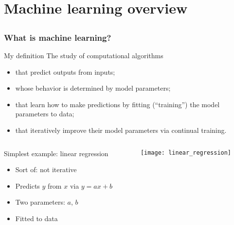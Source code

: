 \section[ML overview]{Machine learning overview}

\subsection{}

\begin{frame}
    \frametitle{What is machine learning?}

    \begin{block}{My definition}
        The study of computational algorithms
        \begin{itemize}
            \item that \alert{predict} outputs from inputs;
            \item whose behavior is determined by \alert{model parameters};
            \item that \alert{learn} how to make predictions by fitting (``training'') the model parameters to data;
            \item that \alert{iteratively} improve their model parameters via continual training.
        \end{itemize}
    \end{block}

    \begin{columns}
        \begin{column}{2.5in}
            Simplest example: linear regression
            \begin{itemize}
                \item Sort of: not iterative
                \item Predicts $y$ from $x$ via $y = ax + b$
                \item Two parameters: $a$, $b$
                \item Fitted to data
            \end{itemize}
        \end{column}
        \begin{column}{1.75in}
            \texttt{[image: linear\_regression]}
        \end{column}
    \end{columns}
\end{frame}

